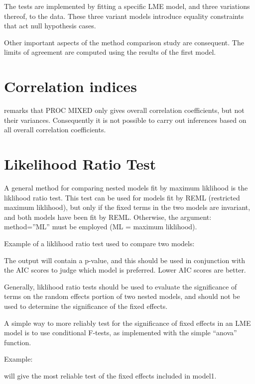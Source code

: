 \documentclass[12pt, a4paper]{report}
\theoremstyle{plain}
\theoremstyle{definition}
\theoremstyle{remark}
\begin{document}
	The tests are implemented by fitting a specific LME model, and three variations thereof, to the data. These three variant models introduce equality constraints that act null hypothesis cases.
	
	Other important aspects of the method comparison study are consequent. The limits of agreement are computed using the results of the first model.
	
	
	\section{Correlation indices}
	\citet{ARoy2009} remarks that PROC MIXED only gives overall correlation coefficients, but not their variances. Consequently it is not possible to carry out inferences based on all overall correlation coefficients.
	
\section{Likelihood Ratio Test}
A general method for comparing nested models fit by maximum liklihood is the liklihood ratio 
test. This test can be used for models fit by REML (restricted maximum liklihood), but only if the 
fixed terms in the two models are invariant, and both models have been fit by REML. Otherwise, 
the argument: method=”ML” must be employed (ML = maximum liklihood). 

Example of a liklihood ratio test used to compare two models: 



The output will contain a p-value, and this should be used in conjunction with the AIC scores to 
judge which model is preferred. Lower AIC scores are better. 

Generally, liklihood ratio tests should be used to evaluate the significance of terms on the 
random effects portion of two nested models, and should not be used to determine the 
significance of the fixed effects. 

A simple way to more reliably test for the significance of fixed effects in an LME model is to use 
conditional F-tests, as implemented with the simple “anova” function. 

Example: 

will give the most reliable test of the fixed effects included in model1. 
\end{document}

